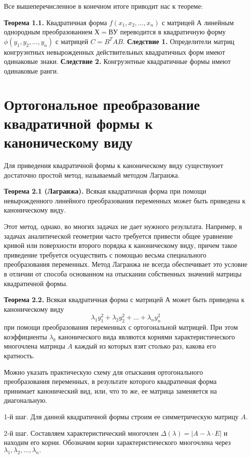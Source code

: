 \documentclass[bachelor, och, coursework, times]{SCWorks}
\newcommand\tab[1][1cm]{\hspace*{#1}}
\newcommand{\tl}{\newline\tab}
\begin{document}
Все вышеперечисленное в конечном итоге приводит нас к теореме:

\textbf{Теорема 1.1.} Квадратичная форма $f(x_1, x_2,...,x_n)$ с матрицей $А$ линейным однородным преобразованием $Х = ВУ$ переводится в квадратичную форму $\phi(y_1, y_2,...,y_n)$ с матрицей $C=B^{T}AB$.
\tl
\textbf{Следствие 1.} Определители матриц конгруэнтных невырожденных действительных квадратичных форм имеют одинаковые знаки.
\tl
\textbf{Следствие 2.} Конгруэнтные квадратичные формы имеют одинаковые ранги.

\section{Ортогональное преобразование квадратичной формы к каноническому виду}

Для приведения квадратичной формы к каноническому виду существуюет достаточно простой метод, называемый методом Лагранжа.

\textbf{Теорема 2.1 (Лагранжа).} Всякая квадратичная форма при помощи невырожденного линейного преобразования переменных может быть приведена к каноническому виду. 


Этот метод, однако, во многих задачах не дает нужного результата. Например, в задачах аналитической геометрии часто требуется привести общее уравнение кривой или поверхности второго порядка к каноническому виду, причем такое приведение требуется осуществить с помощью весьма специального преобразования переменных. Метод Лагранжа не всегда обеспечивает это условие в отличии от способа основанном на отыскании собственных значений матрицы квадратичной формы. 


\textbf{Теорема 2.2.} Всякая квадратичная форма с матрицей $А$ может быть приведена к каноническому виду 
$$ \lambda_1y_1^2+\lambda_2y_2^2+\dots + \lambda_ny_n^2$$
при помощи преобразования переменных с ортогональной матрицей. При этом коэффициенты $ \lambda_k $ канонического вида являются корнями характеристического многочлена матрицы $A$ каждый из которых взят столько раз, какова его кратность. 

Можно указать практическую схему для отыскания ортогонального преобразования переменных, в результате которого квадратичная форма принимает канонический вид, или, что то же, ее матрица заменяется на диагональную. 

1-й шаг. Для данной квадратичной формы строим ее симметрическую матрицу $A$.

2-й шаг. Составляем характеристический многочлен $\Delta(\lambda) = |A - \lambda\cdot E|$ и находим его корни. Обозначим корни характеристического многочлена через $\lambda_1, \lambda_2, \dots, \lambda_n.$
\end{document}
